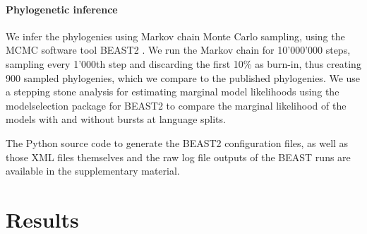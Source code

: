 \documentclass[a4paper,12pt]{scrartcl}
\begin{document}
\paragraph{Phylogenetic inference}
We infer the phylogenies using Markov chain Monte Carlo sampling, using the MCMC
software tool BEAST2 \parencite{beast2}. We run the Markov chain for 10'000'000
steps, sampling every 1'000th step and discarding the first 10\% as burn-in,
thus creating 900 sampled phylogenies, which we compare to the published
phylogenies. We use a stepping stone analysis for estimating marginal model
likelihoods using the modelselection package \parencite{modelselection} for
BEAST2 to compare the marginal likelihood of the models with and without bursts
at language splits.

The Python source code to generate the BEAST2 configuration files, as well as
those XML files themselves and the raw log file outputs of the BEAST runs are
available in the supplementary material.

\section{Results}

\printbibliography{}
\end{document}

